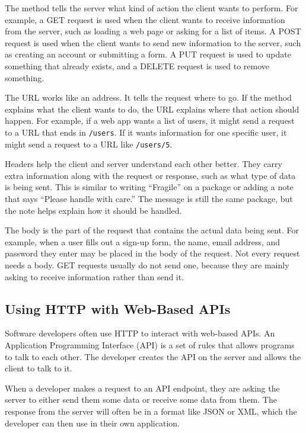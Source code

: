 The method tells the server what kind of action the client wants to
perform. For example, a GET request is used when the client wants to
receive information from the server, such as loading a web page or
asking for a list of items. A POST request is used when the client
wants to send new information to the server, such as creating an
account or submitting a form. A PUT request is used to update
something that already exists, and a DELETE request is used to remove
something.

The URL works like an address. It tells the request where to go. If
the method explains what the client wants to do, the URL explains
where that action should happen. For example, if a web app wants a
list of users, it might send a request to a URL that ends in
\verb|/users|. If it wants information for one specific user, it might
send a request to a URL like \verb|/users/5|.

Headers help the client and server understand each other better. They
carry extra information along with the request or response, such as
what type of data is being sent. This is similar to writing
``Fragile'' on a package or adding a note that says ``Please handle
with care.'' The message is still the same package, but the note helps
explain how it should be handled.

The body is the part of the request that contains the actual data
being sent. For example, when a user fills out a sign-up form, the
name, email address, and password they enter may be placed in the body
of the request. Not every request needs a body. GET requests usually
do not send one, because they are mainly asking to receive information
rather than send it.


\subsection{Using HTTP with Web-Based APIs}


Software developers often use HTTP to interact with web-based APIs. An
Application Programming Interface (API) is a set of rules that allows
programs to talk to each other. The developer creates the API on the
server and allows the client to talk to it.

When a developer makes a request to an API endpoint, they are asking
the server to either send them some data or receive some data from
them. The response from the server will often be in a format like JSON
or XML, which the developer can then use in their own application.

